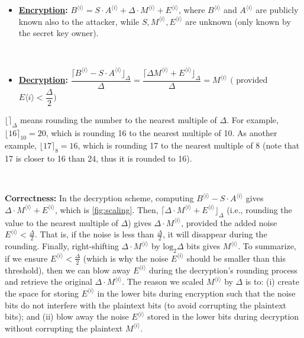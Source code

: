 \begin{tcolorbox}[title={\textbf{\tboxlabel{\ref*{subsec:lattice-scheme}} Lattice-based Cryptosystem}}]
\begin{itemize}
    \item \textbf{\underline{Encryption}: } $B^{\langle i \rangle} = S \cdot A^{\langle i \rangle} + \Delta \cdot M^{\langle i \rangle} + E^{\langle i \rangle}$, where $B^{\langle i \rangle}$ and $A^{\langle i \rangle}$ are publicly known also to the attacker, while $S, M^{\langle i \rangle}, E^{\langle i \rangle}$ are unknown (only known by the secret key owner). 

    $ $
    
    \item \textbf{\underline{Decryption}: } $ \dfrac{\lceil B^{\langle i \rangle} - S \cdot A^{\langle i \rangle} \rfloor_{\Delta}}{\Delta} = \dfrac{\lceil \Delta M^{\langle i \rangle} + E^{\langle i \rangle} \rfloor_{\Delta}}{\Delta} = M^{\langle i \rangle}$ $\Big($ provided $E{\langle i \rangle} < \dfrac{\Delta}{2}\Big )$   
\end{itemize}
\end{tcolorbox}

$\lfloor \rceil_\Delta$ means rounding the number to the nearest multiple of $\Delta$. For example, $\lfloor 16 \rceil_{10} = 20$, which is rounding 16 to the nearest multiple of 10. As another example, $\lfloor 17 \rceil_{8} = 16$, which is rounding 17 to the nearest multiple of 8 (note that 17 is closer to 16 than 24, thus it is rounded to 16). 


$ $

\noindent \textbf{Correctness: } In the decryption scheme, computing $B^{\langle i \rangle} - S \cdot A^{\langle i \rangle}$ gives $\Delta \cdot M^{\langle i \rangle}+ E^{\langle i \rangle}$, which is \autoref{fig:scaling}. Then, $\lceil \Delta \cdot M^{\langle i \rangle} + E^{\langle i \rangle} \rfloor_{\Delta}$ (i.e., rounding the value to the nearest multiple of $\Delta$) gives $\Delta \cdot M^{\langle i \rangle}$, provided the added noise $E^{\langle i \rangle} < \frac{\Delta}{2}$. That is, if the noise is less than $\frac{\Delta}{2}$, it will disappear during the rounding. Finally, right-shifting $\Delta \cdot M^{\langle i \rangle}$ by $\text{log}_2 \Delta$ bits gives $M^{\langle i \rangle}$. To summarize, if we ensure $E^{\langle i \rangle} < \frac{\Delta}{2}$ (which is why the noise $E^{\langle i \rangle}$ should be smaller than this threshold), then we can blow away $E^{\langle i \rangle}$ during the decryption's rounding process and retrieve the original $\Delta \cdot M^{\langle i \rangle}$. The reason we scaled $M^{\langle i \rangle}$ by $\Delta$ is to: (i) create the space for storing $E^{\langle i \rangle}$ in the lower bits during encryption such that the noise bits do not interfere with the plaintext bits (to avoid corrupting the plaintext bits); and (ii) blow away the noise $E^{\langle i \rangle}$ stored in the lower bits during decryption without corrupting the plaintext $M^{\langle i \rangle}$. 

